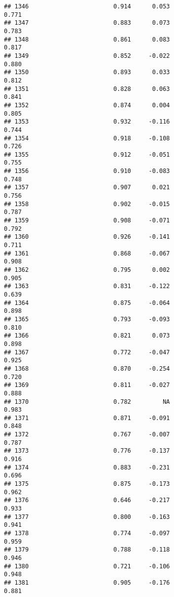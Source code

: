 \documentclass[
]{article}
\begin{document}
\begin{verbatim}
## 1346                        0.914      0.053                     0.771
## 1347                        0.883      0.073                     0.783
## 1348                        0.861      0.083                     0.817
## 1349                        0.852     -0.022                     0.880
## 1350                        0.893      0.033                     0.812
## 1351                        0.828      0.063                     0.841
## 1352                        0.874      0.004                     0.805
## 1353                        0.932     -0.116                     0.744
## 1354                        0.918     -0.108                     0.726
## 1355                        0.912     -0.051                     0.755
## 1356                        0.910     -0.083                     0.748
## 1357                        0.907      0.021                     0.756
## 1358                        0.902     -0.015                     0.787
## 1359                        0.908     -0.071                     0.792
## 1360                        0.926     -0.141                     0.711
## 1361                        0.868     -0.067                     0.908
## 1362                        0.795      0.002                     0.905
## 1363                        0.831     -0.122                     0.639
## 1364                        0.875     -0.064                     0.898
## 1365                        0.793     -0.093                     0.810
## 1366                        0.821      0.073                     0.898
## 1367                        0.772     -0.047                     0.925
## 1368                        0.870     -0.254                     0.720
## 1369                        0.811     -0.027                     0.888
## 1370                        0.782         NA                     0.983
## 1371                        0.871     -0.091                     0.848
## 1372                        0.767     -0.007                     0.787
## 1373                        0.776     -0.137                     0.916
## 1374                        0.883     -0.231                     0.696
## 1375                        0.875     -0.173                     0.962
## 1376                        0.646     -0.217                     0.933
## 1377                        0.800     -0.163                     0.941
## 1378                        0.774     -0.097                     0.959
## 1379                        0.788     -0.118                     0.946
## 1380                        0.721     -0.106                     0.948
## 1381                        0.905     -0.176                     0.881

\end{verbatim}
\end{document}
